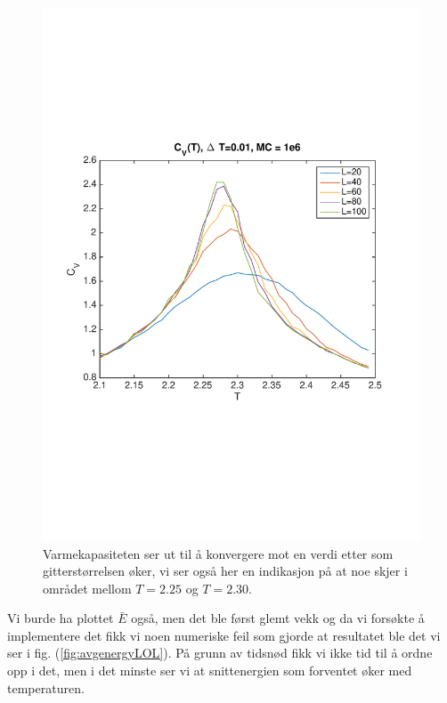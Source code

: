 \documentclass[norsk, 10pt]{article}
\begin{document}
\begin{figure}[H]
	\centering
	\includegraphics[scale = 0.5, trim = 1cm 8cm 1cm 8cm]{cv_difftemp.pdf}
	\caption{Varmekapasiteten ser ut til å konvergere mot en verdi etter som gitterstørrelsen øker, vi ser også her en indikasjon på at noe skjer i området mellom $T=2.25$ og $T = 2.30$.}
	\label{fig:cv_difftemp}
\end{figure}

Vi burde ha plottet $\bar E$ også, men det ble først glemt vekk og da vi forsøkte å implementere det fikk vi noen numeriske feil som gjorde at resultatet ble det vi ser i fig. (\ref{fig:avgenergyLOL}). På grunn av tidsnød fikk vi ikke tid til å ordne opp i det, men i det minste ser vi at snittenergien som forventet øker med temperaturen.
\end{document}
